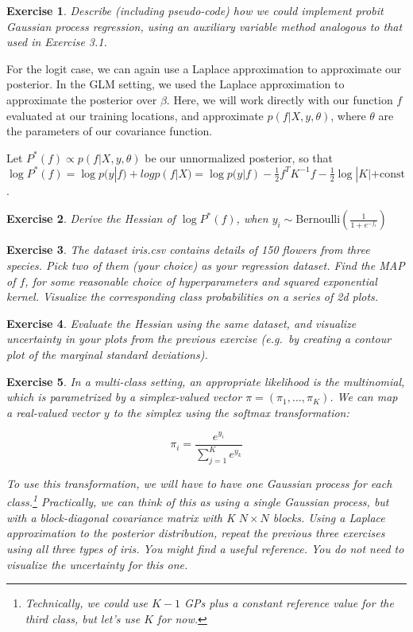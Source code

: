\documentclass[twoside]{article}
\newcounter{lecnum}
\newtheorem{exercise}{Exercise}[lecnum]
\begin{document}
 \begin{exercise}
   Describe (including pseudo-code) how we could implement probit Gaussian process regression, using an auxiliary variable method analogous to that used in Exercise 3.1.
 \end{exercise}

 For the logit case, we can again use a Laplace approximation to approximate our posterior. In the GLM setting, we used the Laplace approximation to approximate the posterior over $\beta$. Here, we will work directly with our function $f$ evaluated at our training locations, and approximate $p(f|X,y,\theta)$, where $\theta$ are the parameters of our covariance function.

 Let $P^*(f)\propto p(f|X,y,\theta)$ be our unnormalized posterior, so that $\log P^*(f) = \log p(y|f) + log p(f|X) = \log p(y|f) -\frac{1}{2}f^TK^{-1}f - \frac{1}{2}\log|K| + \mbox{const}$.

 \begin{exercise}
   Derive the Hessian of $\log P^*(f)$, when $y_i \sim \mbox{Bernoulli}\left(\frac{1}{1+e^{-f_i}}\right)$
 \end{exercise}

 \begin{exercise}
   The dataset iris.csv contains details of 150 flowers from three species. Pick two of them (your choice) as your regression dataset. Find the MAP of $f$, for some reasonable choice of hyperparameters and squared exponential kernel. Visualize the corresponding class probabilities on a series of 2d plots.
 \end{exercise}

 \begin{exercise}
   Evaluate the Hessian using the same dataset, and visualize uncertainty in your plots from the previous exercise (e.g.\ by creating a contour plot of the marginal standard deviations).
   \end{exercise}


 \begin{exercise}
   In a multi-class setting, an appropriate likelihood is the multinomial, which is parametrized by a simplex-valued vector $\pi = (\pi_1,\dots, \pi_K)$. We can map a real-valued vector $y$ to the simplex using the softmax transformation:

   $$\pi_i = \frac{e^{y_i}}{\sum_{j=1}^K e^{y_k}}$$

   To use this transformation, we will have to have one Gaussian process for each class.\footnote{Technically, we could use $K-1$ GPs plus a constant reference value for the third class, but let's use $K$ for now.} Practically, we can think of this as using a single Gaussian process, but with a block-diagonal covariance matrix with K $N\times N$ blocks. Using a Laplace approximation to the posterior distribution, repeat the previous three exercises using all three types of iris. You might find \citep{WilBar1998} a useful reference. You do not need to visualize the uncertainty for this one.
   \end{exercise}



 




  
  
\end{document}
